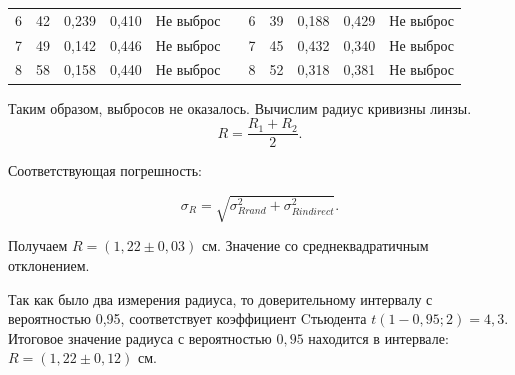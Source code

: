 \documentclass[a4paper,12pt]{article}
\theoremstyle{plain} %
\theoremstyle{definition} %
\theoremstyle{remark} %
\begin{document}
\begin{table}[h!]
\begin{tabular}{lllllllllll}
		\multicolumn{1}{|l|}{6} & \multicolumn{1}{l|}{42} & \multicolumn{1}{l|}{0,239} & \multicolumn{1}{l|}{0,410} & \multicolumn{1}{l|}{Не выброс} & \multicolumn{1}{l|}{} & \multicolumn{1}{l|}{6} & \multicolumn{1}{l|}{39} & \multicolumn{1}{l|}{0,188} & \multicolumn{1}{l|}{0,429} & \multicolumn{1}{l|}{Не выброс} \\ \cline{1-5} \cline{7-11} 
		\multicolumn{1}{|l|}{7} & \multicolumn{1}{l|}{49} & \multicolumn{1}{l|}{0,142} & \multicolumn{1}{l|}{0,446} & \multicolumn{1}{l|}{Не выброс} & \multicolumn{1}{l|}{} & \multicolumn{1}{l|}{7} & \multicolumn{1}{l|}{45} & \multicolumn{1}{l|}{0,432} & \multicolumn{1}{l|}{0,340} & \multicolumn{1}{l|}{Не выброс} \\ \cline{1-5} \cline{7-11} 
		\multicolumn{1}{|l|}{8} & \multicolumn{1}{l|}{58} & \multicolumn{1}{l|}{0,158} & \multicolumn{1}{l|}{0,440} & \multicolumn{1}{l|}{Не выброс} & \multicolumn{1}{l|}{} & \multicolumn{1}{l|}{8} & \multicolumn{1}{l|}{52} & \multicolumn{1}{l|}{0,318} & \multicolumn{1}{l|}{0,381} & \multicolumn{1}{l|}{Не выброс} \\ \cline{1-5} \cline{7-11}   
	\end{tabular}
\end{table}



Таким образом, выбросов не оказалось. Вычислим радиус кривизны линзы.
\begin{equation}
	R = \frac{R_1+R_2}{2}.
\end{equation}

Соответствующая погрешность:

\begin{equation}
	\sigma_R = \sqrt{\sigma_{Rrand}^2+\sigma_{Rindirect}^2} . 
\end{equation}

Получаем $R = (1,22\pm0,03)$ см. Значение со среднеквадратичным отклонением.

Так как было два измерения радиуса, то доверительному интервалу с вероятностью 0,95, соответствует коэффициент Cтьюдента $t(1-0,95;2)=4,3$. Итоговое значение радиуса с вероятностью $0,95$ находится в интервале: $R = (1,22\pm0,12)$ см. 

\newpage
\end{document}
